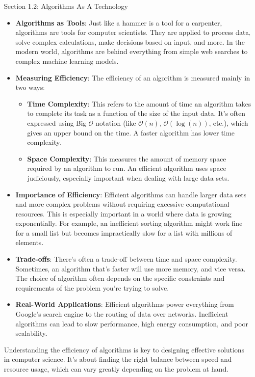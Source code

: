 \begin{notes}{Section 1.2: Algorithms As A Technology}
    \begin{itemize}
        \item \textbf{Algorithms as Tools}: Just like a hammer is a tool for a carpenter, algorithms are tools for computer scientists. They are applied to process data, solve complex calculations, 
        make decisions based on input, and more. In the modern world, algorithms are behind everything from simple web searches to complex machine learning models.
        \item \textbf{Measuring Efficiency}: The efficiency of an algorithm is measured mainly in two ways:
        \begin{itemize}
            \item \textbf{Time Complexity}: This refers to the amount of time an algorithm takes to complete its task as a function of the size of the input data. It's often expressed using Big 
            $\mathcal{O}$ notation (like $\mathcal{O}(n)$, $\mathcal{O}(\log{(n)})$, etc.), which gives an upper bound on the time. A faster algorithm has lower time complexity.
            \item \textbf{Space Complexity}: This measures the amount of memory space required by an algorithm to run. An efficient algorithm uses space judiciously, especially important when dealing 
            with large data sets.
        \end{itemize}
        \item \textbf{Importance of Efficiency}: Efficient algorithms can handle larger data sets and more complex problems without requiring excessive computational resources. This is especially important 
        in a world where data is growing exponentially. For example, an inefficient sorting algorithm might work fine for a small list but becomes impractically slow for a list with millions of elements.
        \item \textbf{Trade-offs}: There's often a trade-off between time and space complexity. Sometimes, an algorithm that's faster will use more memory, and vice versa. The choice of algorithm often 
        depends on the specific constraints and requirements of the problem you're trying to solve.
        \item \textbf{Real-World Applications}: Efficient algorithms power everything from Google's search engine to the routing of data over networks. Inefficient algorithms can lead to slow performance, 
        high energy consumption, and poor scalability.
    \end{itemize}

    Understanding the efficiency of algorithms is key to designing effective solutions in computer science. It's about finding the right balance between speed and resource usage, which can vary greatly 
    depending on the problem at hand.
\end{notes}


